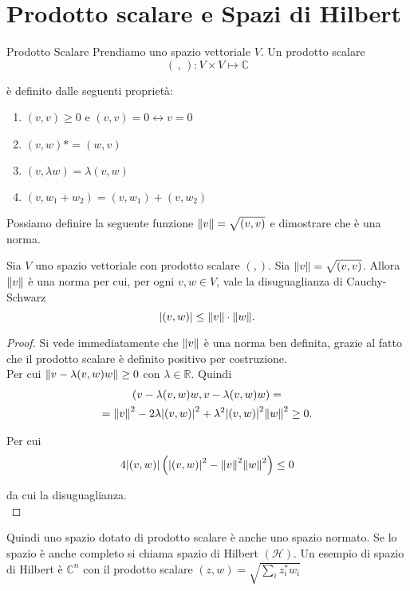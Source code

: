 \chapter{Prodotto scalare e Spazi di Hilbert}

\begin{definition}{Prodotto Scalare}
\label{prod_scal}
Prendiamo uno spazio vettoriale $V$. Un prodotto scalare 
\begin{equation*}
(\,,\,):V \times V \longmapsto \mathbb{C}
\end{equation*}  

è definito dalle seguenti proprietà:
\begin{enumerate}
\item $(v,v) \geq 0$ e $(v,v) = 0 \leftrightarrow v = 0$
\item $(v,w)*=(w,v)$
\item $(v,\lambda w) = \lambda(v,w)$
\item $(v,w_1+w_2) = (v,w_1) + (v,w_2)$
\end{enumerate} 

\end{definition}

Possiamo definire la seguente funzione ${\|v\|}  = \sqrt{(v,v)}$ e dimostrare che è una norma.

\begin{theorem}
Sia $V$ uno spazio vettoriale con prodotto scalare $(,)$. Sia ${\|v\|} = \sqrt{(v,v)}$. Allora ${\|v\|}$ è una norma per cui, per ogni $v,w \in V$, vale la disuguaglianza di Cauchy-Schwarz 
\begin{equation}
\label{dis_sch}
{\left|(v,w)\right|} \leq {\|v\|} \cdot {\|w\|}.
\end{equation} 
\end{theorem}

\begin{proof}
Si vede immediatamente che ${\|v\|}$ è una norma ben definita, grazie al fatto che il prodotto scalare è definito positivo per costruzione. \\
Per cui ${\|v - \lambda(v,w)w\|} \geq 0$ con $\lambda \in \mathbb{R}$. 
Quindi
\begin{gather*}
(v - \lambda(v,w)w,v - \lambda(v,w)w) = \\
={\|v\|}^2 - 2\lambda{\left|(v,w)\right|}^2 +\lambda^2 {\left|(v,w)\right|}^2 {\|w\|}^2 \geq 0 .
\end{gather*}

Per cui
\begin{align*}
4{\left|(v,w)\right|}\left({\left|(v,w)\right|}^2 - {\|v\|}^2 {\|w\|}^2\right) \leq 0
\end{align*}

da cui la disuguaglianza.\\


\end{proof}

Quindi uno spazio dotato di prodotto scalare è anche uno spazio normato. Se lo spazio è anche completo si chiama spazio di Hilbert $\left(\mathcal{H}\right)$. Un esempio di spazio di Hilbert è $\mathbb{C}^n$ con il prodotto scalare $(z,w) = \sqrt{\sum_i z_i^\ast w_i}$